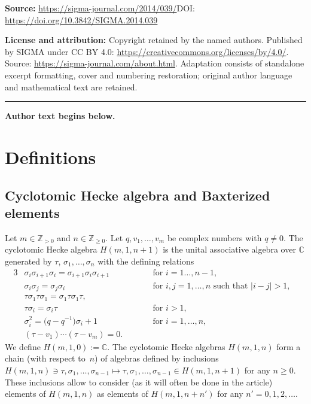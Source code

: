 \documentclass[11pt]{article}
\begin{document}
\noindent\textbf{Source:} \url{https://sigma-journal.com/2014/039/}\quad DOI: \url{https://doi.org/10.3842/SIGMA.2014.039}\par
\noindent\textbf{License and attribution:} Copyright retained by the named authors. Published by SIGMA under CC BY 4.0: \url{https://creativecommons.org/licenses/by/4.0/}. Source: \url{https://sigma-journal.com/about.html}. Adaptation consists of standalone excerpt formatting, cover and numbering restoration; original author language and mathematical text are retained.\par
\medskip\hrule\medskip\noindent\textbf{Author text begins below.}\par
\setcounter{section}{1}
\setcounter{subsection}{0}
\setcounter{subsubsection}{0}
\setcounter{Theorem}{0}
\setcounter{equation}{1}
\section{Def\/initions}\label{sec-def}

\subsection{Cyclotomic Hecke algebra and Baxterized elements}\label{subsec-def}

Let $m\in\mathbb{Z}_{>0}$ and $n\in\mathbb{Z}_{\geq 0}$. Let $q,v_1,\dots,v_m$ be complex numbers with $q\neq 0$.
The cyclotomic Hecke algebra $H(m,1,n+1)$ is the unital associative algebra over $\mathbb{C}$ generated by $\tau$, $\sigma_1,\dots,\sigma_n$ with the def\/ining relations
\begin{alignat*}{3}
& \sigma_i\sigma_{i+1}\sigma_i=\sigma_{i+1}\sigma_i\sigma_{i+1}\qquad  && \text{for $i=1\dots,n-1$},& \nonumber\\
& \sigma_i\sigma_j=\sigma_j\sigma_i \qquad  && \text{for $i,j=1,\dots,n$ such that $|i-j|>1$},& \nonumber\\
& \tau\sigma_1\tau\sigma_1=\sigma_1\tau\sigma_1\tau ,\qquad &&& \nonumber\\
& \tau\sigma_i=\sigma_i\tau \qquad  && \text{for $i>1$},& \nonumber\\
& \sigma_i^2=\big(q-q^{-1}\big)\sigma_i+1 \qquad  && \text{for $i=1,\dots,n$},& \nonumber\\
& (\tau-v_1)\cdots(\tau-v_m)=0  .\qquad &&& %
 \end{alignat*}
We def\/ine $H(m,1,0):=\mathbb{C}$. The cyclotomic Hecke algebras $H(m,1,n)$ form a chain (with respect to~$n$)
of algebras def\/ined by inclusions
$H(m,1,n)\ni \tau,\sigma_1,\dots,\sigma_{n-1}\mapsto  \tau,\sigma_1,\dots,\sigma_{n-1}\in H(m,1,n+1)$ for any $n\geq 0$. These inclusions allow to consider (as it will often be done in the article) elements of $H(m,1,n)$ as elements of $H(m,1,n+n')$ for any $n'=0,1,2,\dots$.
\end{document}
